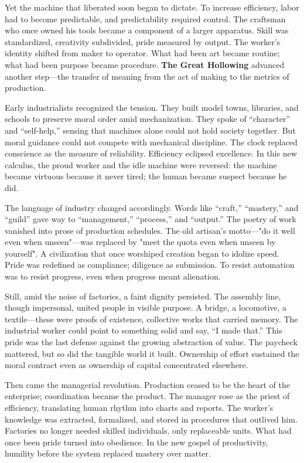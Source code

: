 \documentclass[11pt,twoside]{book}
\begin{document}
Yet the machine that liberated soon began to dictate.  To increase efficiency, labor had to become predictable, and predictability required control.  The craftsman who once owned his tools became a component of a larger apparatus.  Skill was standardized, creativity subdivided, pride measured by output.  The worker’s identity shifted from maker to operator.  What had been art became routine; what had been purpose became procedure.  \textbf{The Great Hollowing} advanced another step—the transfer of meaning from the act of making to the metrics of production.

Early industrialists recognized the tension.  They built model towns, libraries, and schools to preserve moral order amid mechanization.  They spoke of “character” and “self-help,” sensing that machines alone could not hold society together.  But moral guidance could not compete with mechanical discipline.  The clock replaced conscience as the measure of reliability.  Efficiency eclipsed excellence.  In this new calculus, the proud worker and the idle machine were reversed: the machine became virtuous because it never tired; the human became suspect because he did.

The language of industry changed accordingly.  Words like “craft,” “mastery,” and “guild” gave way to “management,” “process,” and “output.”  The poetry of work vanished into prose of production schedules.  The old artisan’s motto—"do it well even when unseen"—was replaced by "meet the quota even when unseen by yourself".  A civilization that once worshiped creation began to idolize speed.  Pride was redefined as compliance; diligence as submission.  To resist automation was to resist progress, even when progress meant alienation.

Still, amid the noise of factories, a faint dignity persisted.  The assembly line, though impersonal, united people in visible purpose.  A bridge, a locomotive, a textile—these were proofs of existence, collective works that carried memory.  The industrial worker could point to something solid and say, “I made that.”  This pride was the last defense against the growing abstraction of value.  The paycheck mattered, but so did the tangible world it built.  Ownership of effort sustained the moral contract even as ownership of capital concentrated elsewhere.

Then came the managerial revolution.  Production ceased to be the heart of the enterprise; coordination became the product.  The manager rose as the priest of efficiency, translating human rhythm into charts and reports.  The worker’s knowledge was extracted, formalized, and stored in procedures that outlived him.  Factories no longer needed skilled individuals, only replaceable units.  What had once been pride turned into obedience.  In the new gospel of productivity, humility before the system replaced mastery over matter.
\end{document}
